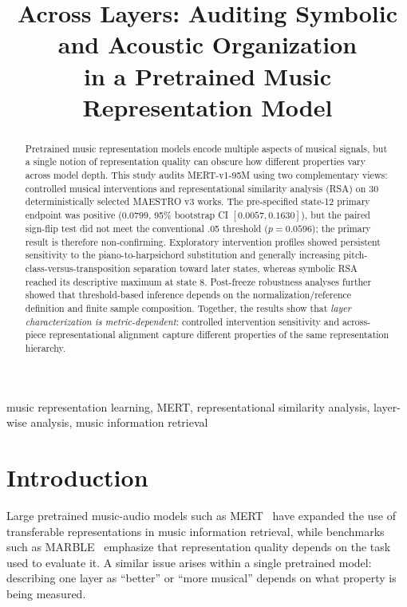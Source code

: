 \documentclass[conference]{IEEEtran}
\title{Across Layers: Auditing Symbolic and Acoustic Organization\\
in a Pretrained Music Representation Model}
\author{
\IEEEauthorblockN{Po-Chen Liu}
\IEEEauthorblockA{
Department of Computer Science\\
National Tsing Hua University\\
Hsinchu, Taiwan\\
noeltimliu.com}
}
\begin{document}
\maketitle

\begin{abstract}
Pretrained music representation models encode multiple aspects of musical
signals, but a single notion of representation quality can obscure how
different properties vary across model depth.
This study audits MERT-v1-95M using two complementary views:
controlled musical interventions and representational similarity analysis
(RSA) on 30 deterministically selected MAESTRO v3 works.
The pre-specified state-12 primary endpoint was positive
($0.0799$, 95\% bootstrap CI $[0.0057, 0.1630]$), but the paired
sign-flip test did not meet the conventional .05 threshold
($p=0.0596$); the primary result is therefore non-confirming.
Exploratory intervention profiles showed persistent sensitivity to the
piano-to-harpsichord substitution and generally increasing
pitch-class-versus-transposition separation toward later states, whereas
symbolic RSA reached its descriptive maximum at state 8.
Post-freeze robustness analyses further showed that threshold-based inference
depends on the normalization/reference definition and finite sample
composition.
Together, the results show that \emph{layer characterization is
metric-dependent}: controlled intervention sensitivity and across-piece
representational alignment capture different properties of the same
representation hierarchy.
\end{abstract}

\begin{IEEEkeywords}
music representation learning, MERT, representational similarity analysis,
layer-wise analysis, music information retrieval
\end{IEEEkeywords}

\section{Introduction}

Large pretrained music-audio models such as MERT~\cite{li2024mert} have
expanded the use of transferable representations in music information
retrieval, while benchmarks such as MARBLE~\cite{yuan2023marble} emphasize
that representation quality depends on the task used to evaluate it.
A similar issue arises within a single pretrained model: describing one layer
as ``better'' or ``more musical'' depends on what property is being measured.
\end{document}

